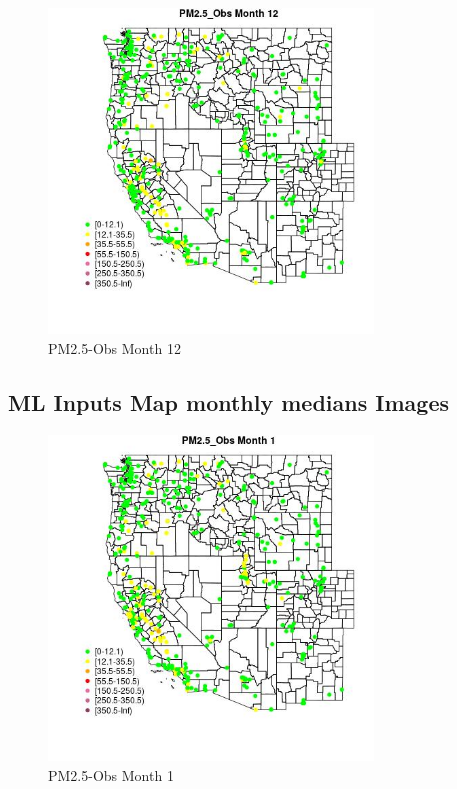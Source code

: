 \begin{figure} 
\centering  
\includegraphics[width=0.77\textwidth]{Code_Outputs/ML_input_report_ML_input_PM25_Step5_part_d_de_duplicated_aves_ML_input_MapObsMo12PM25_Obs.jpg} 
\caption{\label{fig:ML_input_report_ML_input_PM25_Step5_part_d_de_duplicated_aves_ML_inputMapObsMo12PM25_Obs}PM2.5-Obs Month 12} 
\end{figure} 
 

\subsection{ML Inputs Map monthly medians Images} 
 

\begin{figure} 
\centering  
\includegraphics[width=0.77\textwidth]{Code_Outputs/ML_input_report_ML_input_PM25_Step5_part_d_de_duplicated_aves_ML_input_MapObsMo1PM25_Obs.jpg} 
\caption{\label{fig:ML_input_report_ML_input_PM25_Step5_part_d_de_duplicated_aves_ML_inputMapObsMo1PM25_Obs}PM2.5-Obs Month 1} 
\end{figure} 
 

